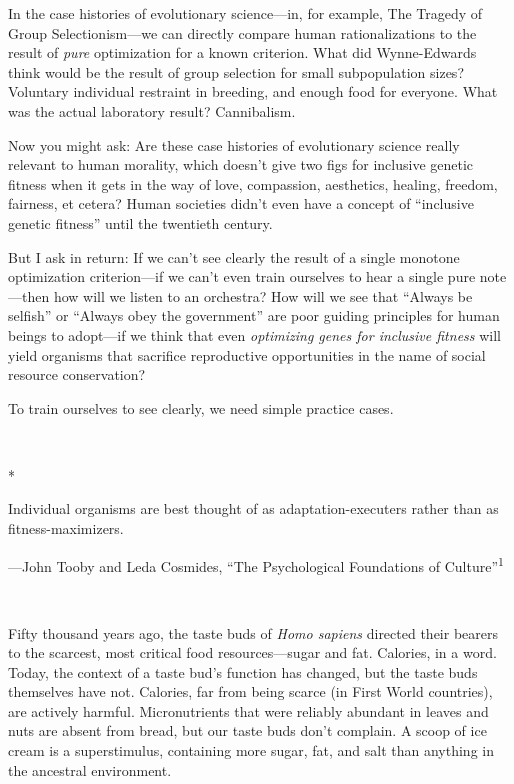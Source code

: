 {
 In the case histories of evolutionary science---in, for example,
The Tragedy of Group Selectionism---we can directly compare human
rationalizations to the result of \textit{pure} optimization for a
known criterion. What did Wynne-Edwards think would be the result of
group selection for small subpopulation sizes? Voluntary individual
restraint in breeding, and enough food for everyone. What was the
actual laboratory result? Cannibalism.}

{
 Now you might ask: Are these case histories of evolutionary
science really relevant to human morality, which
doesn't give two figs for inclusive genetic fitness
when it gets in the way of love, compassion, aesthetics, healing,
freedom, fairness, et cetera? Human societies didn't
even have a concept of ``inclusive genetic
fitness'' until the twentieth century.}

{
 But I ask in return: If we can't see clearly the
result of a single monotone optimization criterion---if we
can't even train ourselves to hear a single pure
note---then how will we listen to an orchestra? How will we see that
``Always be selfish'' or
``Always obey the government'' are
poor guiding principles for human beings to adopt---if we think that
even \textit{optimizing genes for inclusive fitness} will yield
organisms that sacrifice reproductive opportunities in the name of
social resource conservation?}

{
 To train ourselves to see clearly, we need simple practice cases.}

{\centering
 \ ~
\par}

{\centering
 *
\par}


{
 Individual organisms are best thought of as adaptation-executers
rather than as fitness-maximizers.}

{\raggedleft
 {}---John Tooby and Leda Cosmides,\newline
 ``The Psychological Foundations of
Culture''\textsuperscript{1}
\par}


\bigskip

{
 ~}

{
 Fifty thousand years ago, the taste buds of \textit{Homo sapiens}
directed their bearers to the scarcest, most critical food
resources---sugar and fat. Calories, in a word. Today, the context of a
taste bud's function has changed, but the taste buds
themselves have not. Calories, far from being scarce (in First World
countries), are actively harmful. Micronutrients that were reliably
abundant in leaves and nuts are absent from bread, but our taste buds
don't complain. A scoop of ice cream is a
superstimulus, containing more sugar, fat, and salt than anything in
the ancestral environment.}

